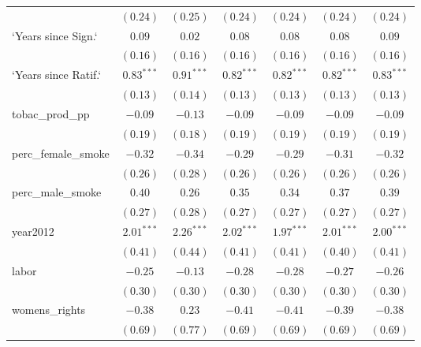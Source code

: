 \begin{table}[!h]
\begin{center}
\begin{tabular}{l c c c c c c }
                        & $(0.24)$     & $(0.25)$     & $(0.24)$     & $(0.24)$     & $(0.24)$     & $(0.24)$     \\
`Years since Sign.`     & $0.09$       & $0.02$       & $0.08$       & $0.08$       & $0.08$       & $0.09$       \\
                        & $(0.16)$     & $(0.16)$     & $(0.16)$     & $(0.16)$     & $(0.16)$     & $(0.16)$     \\
`Years since Ratif.`    & $0.83^{***}$ & $0.91^{***}$ & $0.82^{***}$ & $0.82^{***}$ & $0.82^{***}$ & $0.83^{***}$ \\
                        & $(0.13)$     & $(0.14)$     & $(0.13)$     & $(0.13)$     & $(0.13)$     & $(0.13)$     \\
tobac\_prod\_pp         & $-0.09$      & $-0.13$      & $-0.09$      & $-0.09$      & $-0.09$      & $-0.09$      \\
                        & $(0.19)$     & $(0.18)$     & $(0.19)$     & $(0.19)$     & $(0.19)$     & $(0.19)$     \\
perc\_female\_smoke     & $-0.32$      & $-0.34$      & $-0.29$      & $-0.29$      & $-0.31$      & $-0.32$      \\
                        & $(0.26)$     & $(0.28)$     & $(0.26)$     & $(0.26)$     & $(0.26)$     & $(0.26)$     \\
perc\_male\_smoke       & $0.40$       & $0.26$       & $0.35$       & $0.34$       & $0.37$       & $0.39$       \\
                        & $(0.27)$     & $(0.28)$     & $(0.27)$     & $(0.27)$     & $(0.27)$     & $(0.27)$     \\
year2012                & $2.01^{***}$ & $2.26^{***}$ & $2.02^{***}$ & $1.97^{***}$ & $2.01^{***}$ & $2.00^{***}$ \\
                        & $(0.41)$     & $(0.44)$     & $(0.41)$     & $(0.41)$     & $(0.40)$     & $(0.41)$     \\
labor                   & $-0.25$      & $-0.13$      & $-0.28$      & $-0.28$      & $-0.27$      & $-0.26$      \\
                        & $(0.30)$     & $(0.30)$     & $(0.30)$     & $(0.30)$     & $(0.30)$     & $(0.30)$     \\
womens\_rights          & $-0.38$      & $0.23$       & $-0.41$      & $-0.41$      & $-0.39$      & $-0.38$      \\
                        & $(0.69)$     & $(0.77)$     & $(0.69)$     & $(0.69)$     & $(0.69)$     & $(0.69)$     \\

\end{tabular}
\end{center}
\end{table}
